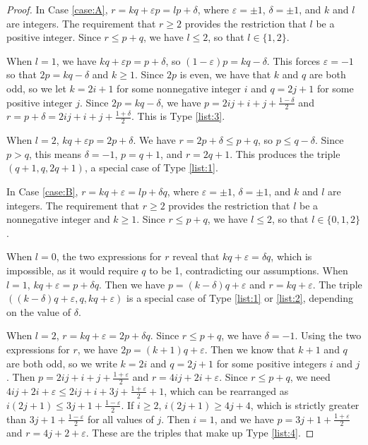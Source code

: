 \documentclass{amsart}
\newcommand{\eps}{\varepsilon}
\begin{document}
\begin{proof}
In Case \ref{case:A}, $r = kq + \eps p  = lp + \delta$, where $\eps = \pm 1$, $\delta = \pm 1$, and $k$ and $l$ are integers. The requirement that $r \ge 2$ provides the restriction that $l$ be a positive integer. Since $r \le p+q$, we have $l \le 2$, so that $l \in \{1,2\}$.

When $l = 1$, we have $kq + \eps p = p + \delta$, so $(1-\eps) p = kq - \delta$. This forces $\eps = -1$ so that $2p = kq - \delta$ and $k \ge 1$. Since $2p$ is even, we have that  $k$ and $q$ are both odd, so we let $k = 2i+1$ for some nonnegative integer $i$ and $q = 2j+1$ for some positive integer $j$. Since $2p = kq - \delta$, we have $p = 2ij + i + j + \frac{1-\delta}{2}$ and $r = p + \delta = 2ij + i + j + \frac{1+\delta}{2}$. This is Type \ref{list:3}.

When $l = 2$, $kq + \eps p = 2p + \delta$. We have $r = 2p + \delta \le p+ q$, so $p \le q - \delta$. Since $p>q$, this means $\delta = -1$, $p = q+1$, and $r = 2q+1$. This produces the triple $(q+1, q, 2q+1)$, a special case of Type \ref{list:1}. 

In Case \ref{case:B}, $r = kq + \eps = lp + \delta q$, where $\eps = \pm 1$, $\delta = \pm 1$, and $k$ and $l$ are integers. The requirement that $r \ge 2$ provides the restriction that $l$ be a nonnegative integer and $k \ge 1$. Since $r \le p+q$, we have $l \le 2$, so that $l \in \{0, 1,2\}$.

When $l = 0$, the two expressions for $r$ reveal that $kq + \eps = \delta q$, which is impossible, as it would require $q$ to be 1, contradicting our assumptions. When $l = 1$,  $kq  + \eps = p + \delta q$. Then we have $p = (k - \delta ) q + \eps$ and $r = kq  + \eps$. The triple $((k - \delta ) q + \eps, q, kq + \eps)$ is a special case of Type \ref{list:1} or \ref{list:2}, depending on the value of $\delta$.

When $l = 2$, $r = kq + \eps = 2p + \delta q$. Since $r \le p+q$, we have $\delta = -1$. Using the two expressions for $r$, we have $2p = (k+1)q  + \eps$. Then we know that $k+1$ and $q$ are both odd, so we write $k = 2i$ and $q = 2j + 1$ for some positive integers $i$ and $j$. Then $p = 2ij + i + j + \frac{1+\eps}{2}$ and $r = 4ij + 2i +\eps$. Since $r \le p + q$, we need $4ij + 2i +\eps \le 2ij + i + 3j + \frac{1+\eps}{2} +1$, which can be rearranged as $i(2j + 1)  \le 3j+1 + \frac{1-\eps}{2}$. If $i \ge 2$, $i(2j+1) \ge 4j+4$, which is strictly greater than $3j+1 + \frac{1-\eps}{2}$ for all values of $j$. Then $i = 1$, and we have $p = 3j+1 + \frac{1+\eps}{2}$ and $r = 4j + 2 + \eps$. These are the triples that make up Type \ref{list:4}.


\end{proof}
\end{document}

